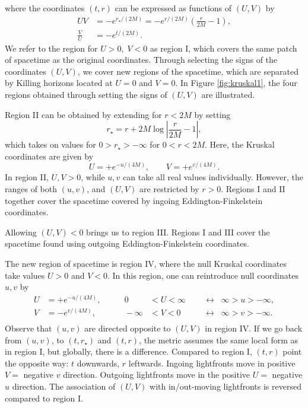 where the coordinates $(t,r)$ can be expressed as functions of $(U,V)$ by
\begin{equation*}
\begin{aligned}
		UV &= - e^{r_\star / (2M)} =  - e^{r / (2M)} \left( \frac{r}{2M} - 1 \right), \\
	\frac{V}{U} &= - e^{t / (2M)}.
\end{aligned}
\end{equation*}
We refer to the region for $U > 0, \; V < 0$ as region I, which covers the same patch of spacetime as the original \sch coordinates. Through selecting the signs of the coordinates $(U,V)$, we cover new regions of the spacetime, which are separated by Killing horizons located at $U = 0$ and $V = 0$. In Figure \ref{fig:kruskal1}, the four regions obtained through setting the signs of $(U,V)$ are illustrated.

Region II can be obtained by extending  for $r <2M$ by setting
\begin{equation*}
	r_\star = r + 2M \log \left| \frac{r}{2M} - 1 \right|,
\end{equation*}
which takes on values for $0 > r_\star > -\infty$ for $0 <r < 2M$. Here, the Kruskal coordinates are given by
\begin{equation*}
	U = + e^{-u / (4M)}, \qquad V = + e^{v / (4M)}.
\end{equation*} 
In region II, $U, V > 0$, while $u, v$ can take all real values individually. However, the ranges of both $(u, v)$, and $(U, V)$ are restricted by $r > 0$. Regions I and II together cover the spacetime covered by ingoing Eddington-Finkelstein coordinates.

Allowing $(U,V) < 0$ brings us to region III. Regions I and III cover the spacetime found using outgoing Eddington-Finkelstein coordinates.

The new region of spacetime is region IV, where the null Kruskal coordinates take values $U > 0$ and $V < 0$. In this region, one can reintroduce null coordinates $u, v$ by
\begin{equation*}
\begin{aligned}
	U &= + e^{-u / (4M)}, & \qquad 0 &< U < \infty  \;\; &&\leftrightarrow \;\; \infty > u > - \infty , \\ 
	V &= - e^{v / (4M)}, & \qquad -\infty &< V < 0 \;\;&&\leftrightarrow \;\; \infty > v > - \infty. \\ 
\end{aligned}
\end{equation*}
Observe that $(u,v)$ are directed opposite to $(U,V)$ in region IV. If we go back from $(u, v)$, to $(t, r_\star)$ and $(t, r)$, the metric assumes the same local form  as in region I, but globally, there is a difference. Compared to region I, $(t, r)$ point the opposite way: $t$ downwards, $r$ leftwards. Ingoing lightfronts move in positive $V =$ negative $v$ direction. Outgoing lightfronts move in the positive $U =$ negative $u$ direction. The association of $(U, V)$ with in/out-moving lightfronts is reversed compared to region I.

